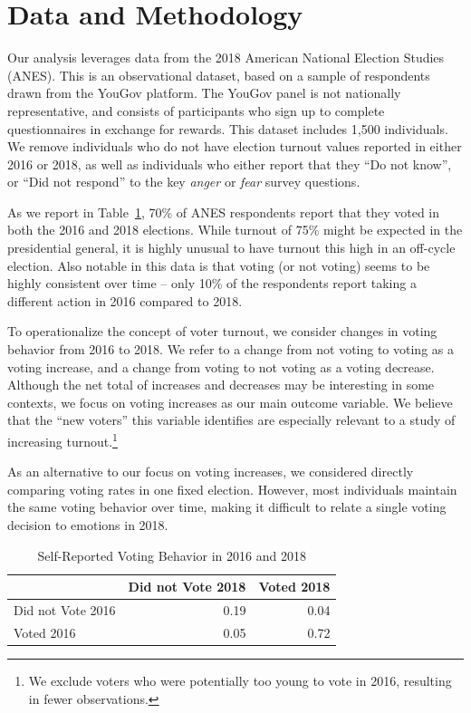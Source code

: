 \documentclass[
  letterpaper,
  DIV=11,
  numbers=noendperiod,
  onecolumn]{scrartcl}
\begin{document}
\section{Data and Methodology}\label{data-and-methodology}

Our analysis leverages data from the 2018 American National Election
Studies (ANES). This is an observational dataset, based on a sample of
respondents drawn from the YouGov platform. The YouGov panel is not
nationally representative, and consists of participants who sign up to
complete questionnaires in exchange for rewards. This dataset includes
1,500 individuals. We remove individuals who do not have election
turnout values reported in either 2016 or 2018, as well as individuals
who either report that they ``Do not know'', or ``Did not respond'' to
the key \emph{anger} or \emph{fear} survey questions.

As we report in Table~\ref{tbl-summary}, 70\% of ANES respondents report
that they voted in both the 2016 and 2018 elections. While turnout of
75\% might be expected in the presidential general, it is highly unusual
to have turnout this high in an off-cycle election. Also notable in this
data is that voting (or not voting) seems to be highly consistent over
time -- only 10\% of the respondents report taking a different action in
2016 compared to 2018.

To operationalize the concept of voter turnout, we consider changes in
voting behavior from 2016 to 2018. We refer to a change from not voting
to voting as a voting increase, and a change from voting to not voting
as a voting decrease. Although the net total of increases and decreases
may be interesting in some contexts, we focus on voting increases as our
main outcome variable. We believe that the ``new voters'' this variable
identifies are especially relevant to a study of increasing
turnout.\footnote{We exclude voters who were potentially too young to
  vote in 2016, resulting in fewer observations.}

As an alternative to our focus on voting increases, we considered
directly comparing voting rates in one fixed election. However, most
individuals maintain the same voting behavior over time, making it
difficult to relate a single voting decision to emotions in 2018.

\begin{longtable}[]{@{}lrr@{}}

\caption{\label{tbl-summary}Self-Reported Voting Behavior in 2016 and
2018}

\tabularnewline

\toprule\noalign{}
& Did not Vote 2018 & Voted 2018 \\
\midrule\noalign{}
\endhead
\bottomrule\noalign{}
\endlastfoot
Did not Vote 2016 & 0.19 & 0.04 \\
Voted 2016 & 0.05 & 0.72 \\

\end{longtable}
\end{document}
